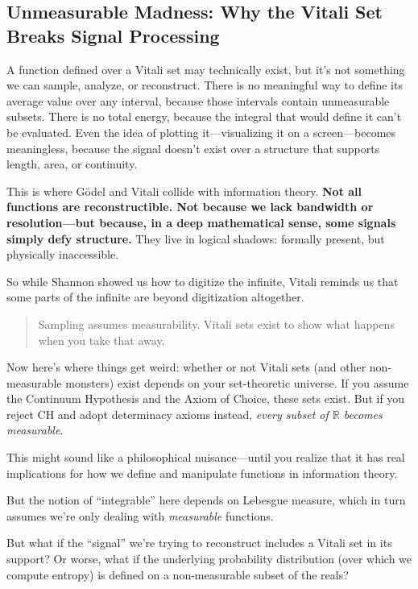 \subsection{Unmeasurable Madness: Why the Vitali Set Breaks Signal Processing}

A function defined over a Vitali set may technically exist, but it's not something we can sample, analyze, or reconstruct. There is no meaningful way to define its average value over any interval, because those intervals contain unmeasurable subsets. There is no total energy, because the integral that would define it can't be evaluated. Even the idea of plotting it—visualizing it on a screen—becomes meaningless, because the signal doesn't exist over a structure that supports length, area, or continuity.

This is where Gödel and Vitali collide with information theory. \textbf{Not all functions are reconstructible. Not because we lack bandwidth or resolution—but because, in a deep mathematical sense, some signals simply defy structure.} They live in logical shadows: formally present, but physically inaccessible.

So while Shannon showed us how to digitize the infinite, Vitali reminds us that some parts of the infinite are beyond digitization altogether.

\begin{quote}
Sampling assumes measurability. Vitali sets exist to show what happens when you take that away.
\end{quote}

Now here’s where things get weird: whether or not Vitali sets (and other non-measurable monsters) exist depends on your set-theoretic universe. If you assume the Continuum Hypothesis and the Axiom of Choice, these sets exist. But if you reject CH and adopt determinacy axioms instead, \emph{every subset of \(\mathbb{R}\) becomes measurable}.

This might sound like a philosophical nuisance—until you realize that it has real implications for how we define and manipulate functions in information theory.

But the notion of “integrable” here depends on Lebesgue measure, which in turn assumes we’re only dealing with \emph{measurable} functions.

But what if the “signal” we’re trying to reconstruct includes a Vitali set in its support? Or worse, what if the underlying probability distribution (over which we compute entropy) is defined on a non-measurable subset of the reals?

